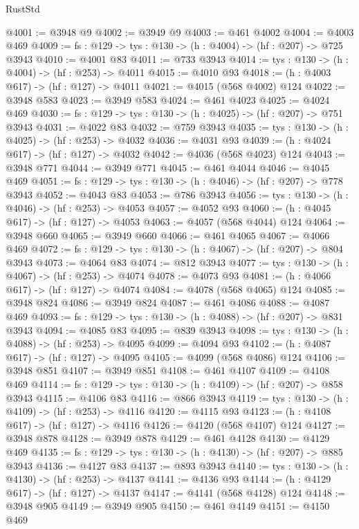 \begin{lexlean}{RustStd}
\begin{coremodule}
@4001 := @3948 @9
@4002 := @3949 @9
@4003 := @461 @4002
@4004 := @4003 @469
@4009 := {fs : @129} -> {tys : @130} -> (h : @4004) -> (hf : @207) -> @725 @3943
@4010 := @4001 @83
@4011 := @733 @3943
@4014 := {tys : @130} -> (h : @4004) -> (hf : @253) -> @4011
@4015 := @4010 @93
@4018 := (h : @4003 @617) -> (hf : @127) -> @4011
@4021 := @4015 (@568 @4002) @124
@4022 := @3948 @583
@4023 := @3949 @583
@4024 := @461 @4023
@4025 := @4024 @469
@4030 := {fs : @129} -> {tys : @130} -> (h : @4025) -> (hf : @207) -> @751 @3943
@4031 := @4022 @83
@4032 := @759 @3943
@4035 := {tys : @130} -> (h : @4025) -> (hf : @253) -> @4032
@4036 := @4031 @93
@4039 := (h : @4024 @617) -> (hf : @127) -> @4032
@4042 := @4036 (@568 @4023) @124
@4043 := @3948 @771
@4044 := @3949 @771
@4045 := @461 @4044
@4046 := @4045 @469
@4051 := {fs : @129} -> {tys : @130} -> (h : @4046) -> (hf : @207) -> @778 @3943
@4052 := @4043 @83
@4053 := @786 @3943
@4056 := {tys : @130} -> (h : @4046) -> (hf : @253) -> @4053
@4057 := @4052 @93
@4060 := (h : @4045 @617) -> (hf : @127) -> @4053
@4063 := @4057 (@568 @4044) @124
@4064 := @3948 @660
@4065 := @3949 @660
@4066 := @461 @4065
@4067 := @4066 @469
@4072 := {fs : @129} -> {tys : @130} -> (h : @4067) -> (hf : @207) -> @804 @3943
@4073 := @4064 @83
@4074 := @812 @3943
@4077 := {tys : @130} -> (h : @4067) -> (hf : @253) -> @4074
@4078 := @4073 @93
@4081 := (h : @4066 @617) -> (hf : @127) -> @4074
@4084 := @4078 (@568 @4065) @124
@4085 := @3948 @824
@4086 := @3949 @824
@4087 := @461 @4086
@4088 := @4087 @469
@4093 := {fs : @129} -> {tys : @130} -> (h : @4088) -> (hf : @207) -> @831 @3943
@4094 := @4085 @83
@4095 := @839 @3943
@4098 := {tys : @130} -> (h : @4088) -> (hf : @253) -> @4095
@4099 := @4094 @93
@4102 := (h : @4087 @617) -> (hf : @127) -> @4095
@4105 := @4099 (@568 @4086) @124
@4106 := @3948 @851
@4107 := @3949 @851
@4108 := @461 @4107
@4109 := @4108 @469
@4114 := {fs : @129} -> {tys : @130} -> (h : @4109) -> (hf : @207) -> @858 @3943
@4115 := @4106 @83
@4116 := @866 @3943
@4119 := {tys : @130} -> (h : @4109) -> (hf : @253) -> @4116
@4120 := @4115 @93
@4123 := (h : @4108 @617) -> (hf : @127) -> @4116
@4126 := @4120 (@568 @4107) @124
@4127 := @3948 @878
@4128 := @3949 @878
@4129 := @461 @4128
@4130 := @4129 @469
@4135 := {fs : @129} -> {tys : @130} -> (h : @4130) -> (hf : @207) -> @885 @3943
@4136 := @4127 @83
@4137 := @893 @3943
@4140 := {tys : @130} -> (h : @4130) -> (hf : @253) -> @4137
@4141 := @4136 @93
@4144 := (h : @4129 @617) -> (hf : @127) -> @4137
@4147 := @4141 (@568 @4128) @124
@4148 := @3948 @905
@4149 := @3949 @905
@4150 := @461 @4149
@4151 := @4150 @469

\end{coremodule}
\end{lexlean}
